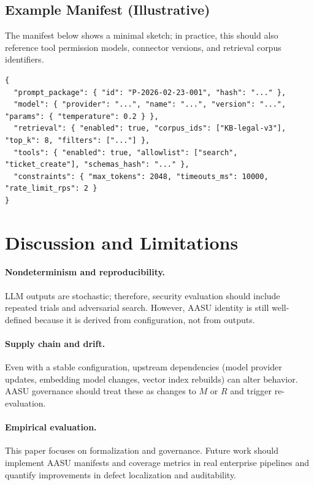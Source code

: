 \documentclass[11pt]{article}
\newcommand{\AASU}{\textsc{AASU}}
\begin{document}
\subsection{Example Manifest (Illustrative)}
The manifest below shows a minimal sketch; in practice, this should also reference tool permission models, connector versions, and retrieval corpus identifiers.

\begin{lstlisting}[caption={Illustrative AASU manifest skeleton (JSON).},label={lst:manifest}]
{
  "prompt_package": { "id": "P-2026-02-23-001", "hash": "..." },
  "model": { "provider": "...", "name": "...", "version": "...", "params": { "temperature": 0.2 } },
  "retrieval": { "enabled": true, "corpus_ids": ["KB-legal-v3"], "top_k": 8, "filters": ["..."] },
  "tools": { "enabled": true, "allowlist": ["search", "ticket_create"], "schemas_hash": "..." },
  "constraints": { "max_tokens": 2048, "timeouts_ms": 10000, "rate_limit_rps": 2 }
}
\end{lstlisting}

\section{Discussion and Limitations}
\paragraph{Nondeterminism and reproducibility.}
LLM outputs are stochastic; therefore, security evaluation should include repeated trials and adversarial search.
However, \AASU{} identity is still well-defined because it is derived from configuration, not from outputs.

\paragraph{Supply chain and drift.}
Even with a stable configuration, upstream dependencies (model provider updates, embedding model changes, vector index rebuilds) can alter behavior.
\AASU{} governance should treat these as changes to $M$ or $R$ and trigger re-evaluation.

\paragraph{Empirical evaluation.}
This paper focuses on formalization and governance.
Future work should implement \AASU{} manifests and coverage metrics in real enterprise pipelines and quantify improvements in defect localization and auditability.
\end{document}
